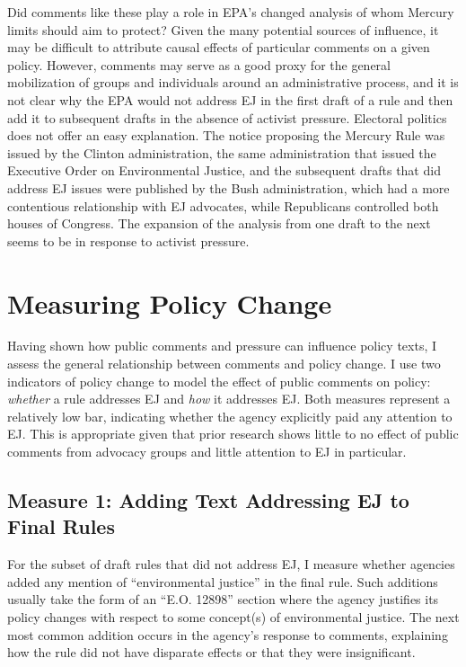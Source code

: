 \documentclass[
      12pt,
        ]{article}
\begin{document}
Did comments like these play a role in EPA's changed analysis of
whom Mercury limits should aim to protect?
Given the many potential sources of influence, it may be difficult to
attribute causal effects of particular comments on a given policy.
However, comments may serve as a good proxy for the general mobilization
of groups and individuals around an administrative process, and it is
not clear why the EPA would not address EJ in the first
draft of a rule and then add it to subsequent drafts in the absence of
activist pressure. Electoral politics does not offer an easy
explanation. The notice proposing the Mercury Rule was issued by the
Clinton administration, the same administration that issued the
Executive Order on Environmental Justice, and the subsequent drafts that
did address EJ issues were published by the Bush
administration, which had a more contentious relationship with
EJ advocates, while Republicans controlled both
houses of Congress. The expansion of the analysis from one draft to the
next seems to be in response to activist pressure.

\hypertarget{measuring-policy-change}{%
\section{Measuring Policy Change}\label{measuring-policy-change}}

Having shown how public comments and pressure can influence policy texts, I assess the general relationship between comments and policy change. I use two indicators of policy change to model the effect of public comments on policy: \emph{whether} a rule addresses EJ and \emph{how} it addresses EJ. Both measures represent a relatively low bar, indicating whether the agency explicitly paid any attention to EJ. This is appropriate given that prior research shows little to no effect of public comments from advocacy groups and little attention to EJ in particular.

\hypertarget{measure-1-adding-text-addressing-ej-to-final-rules}{%
\subsection{Measure 1: Adding Text Addressing EJ to Final Rules}\label{measure-1-adding-text-addressing-ej-to-final-rules}}

For the subset of draft rules that did not address EJ, I measure whether agencies added any mention of ``environmental justice'' in the final rule. Such additions usually take the form of an ``E.O. 12898'' section where the agency justifies its policy changes with respect to some concept(s) of environmental justice. The next most common addition occurs in the agency's response to comments, explaining how the rule did not have disparate effects or that they were insignificant.
\end{document}
